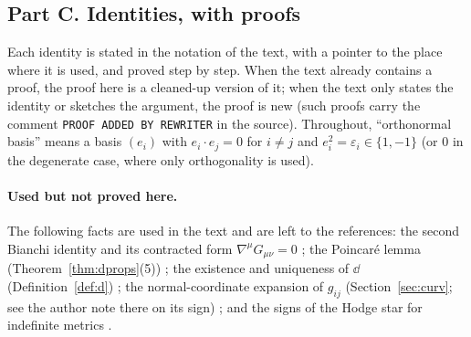 \subsection*{Part C. Identities, with proofs}

Each identity is stated in the notation of the text, with a pointer to the place where it is used, and proved step by step.
When the text already contains a proof, the proof here is a cleaned-up version of it; when the text only states the identity or
sketches the argument, the proof is new (such proofs carry the comment \texttt{PROOF ADDED BY REWRITER} in the source).
Throughout, ``orthonormal basis'' means a basis $(e_i)$ with $e_i\cdot e_j=0$ for $i\neq j$ and $e_i^2=\varepsilon_i\in\{1,-1\}$
(or $0$ in the degenerate case, where only orthogonality is used).

\paragraph{Used but not proved here.} The following facts are used in the text and are left to the references:
the second Bianchi identity and its contracted form $\nabla^\mu G_{\mu\nu}=0$ \cite{Lee,Carroll}; the Poincar\'e lemma
(Theorem~\ref{thm:dprops}(5)) \cite{Spivak,BottTu}; the existence and uniqueness of $\dd$ (Definition~\ref{def:d}) \cite{Lee};
the normal-coordinate expansion of $g_{ij}$ (Section~\ref{sec:curv}; see the author note there on its sign) \cite{Lee};
and the signs of the Hodge star for indefinite metrics \cite{Carroll}.
